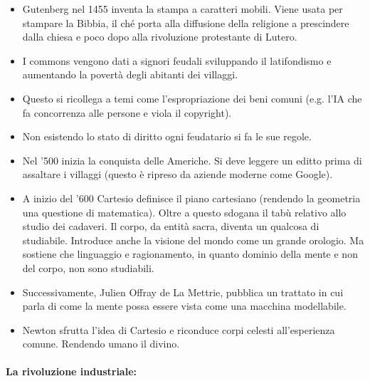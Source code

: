 \begin{itemize}
  \item Gutenberg nel 1455 inventa la stampa a caratteri mobili. Viene usata per stampare la Bibbia, il ché porta alla diffusione della religione a prescindere dalla chiesa e poco dopo alla rivoluzione protestante di Lutero.
  \item I commons vengono dati a signori feudali sviluppando il latifondismo e aumentando la povertà degli abitanti dei villaggi. 
  \item Questo si ricollega a temi come l'espropriazione dei beni comuni (e.g. l'IA che fa concorrenza alle persone e viola il copyright).
  \item Non esistendo lo stato di diritto ogni feudatario si fa le sue regole.
  \item Nel '500 inizia la conquista delle Americhe. Si deve leggere un editto prima di assaltare i villaggi (questo è ripreso da aziende moderne come Google).
  \item A inizio del '600 Cartesio definisce il piano cartesiano (rendendo la geometria una questione di matematica). Oltre a questo sdogana il tabù relativo allo studio dei cadaveri. Il corpo, da entità sacra, diventa un qualcosa di studiabile. Introduce anche la visione del mondo come un grande orologio. Ma sostiene che linguaggio e ragionamento, in quanto dominio della mente e non del corpo, non sono studiabili.
  \item Successivamente, Julien Offray de La Mettrie, pubblica un trattato in cui parla di come la mente possa essere vista come una macchina modellabile. 
  \item Newton sfrutta l'idea di Cartesio e riconduce corpi celesti all'esperienza comune. Rendendo umano il divino. 
\end{itemize}

\paragraph{La rivoluzione industriale:}

